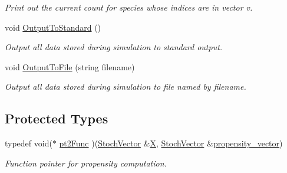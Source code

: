 \begin{CompactItemize}
\begin{CompactList}\small\item\em Print out the current count for species whose indices are in vector v. \item\end{CompactList}\item 
\hypertarget{class_base_system_e77b52d0c57de2f98ea06bc255ca64c4}{
void \hyperlink{class_base_system_e77b52d0c57de2f98ea06bc255ca64c4}{OutputToStandard} ()}
\label{class_base_system_e77b52d0c57de2f98ea06bc255ca64c4}

\begin{CompactList}\small\item\em Output all data stored during simulation to standard output. \item\end{CompactList}\item 
\hypertarget{class_base_system_3bf4ff20738ea3cd2b00344eb9eda7e0}{
void \hyperlink{class_base_system_3bf4ff20738ea3cd2b00344eb9eda7e0}{OutputToFile} (string filename)}
\label{class_base_system_3bf4ff20738ea3cd2b00344eb9eda7e0}

\begin{CompactList}\small\item\em Output all data stored during simulation to file named by filename. \item\end{CompactList}\end{CompactItemize}
\subsection*{Protected Types}
\begin{CompactItemize}
\item 
typedef void($\ast$ \hyperlink{class_base_system_9ce58c7ac60c7208b32233435ee5fd72}{pt2Func} )(\hyperlink{class_stoch_vector}{StochVector} \&\hyperlink{class_base_system_1727d447a5fb8c717c72af8eb9ebe2c3}{X}, \hyperlink{class_stoch_vector}{StochVector} \&\hyperlink{class_base_system_95055447038b0fcb98e032142c56ccb9}{propensity\_\-vector})
\begin{CompactList}\small\item\em Function pointer for propensity computation. \item\end{CompactList}\end{CompactItemize}
